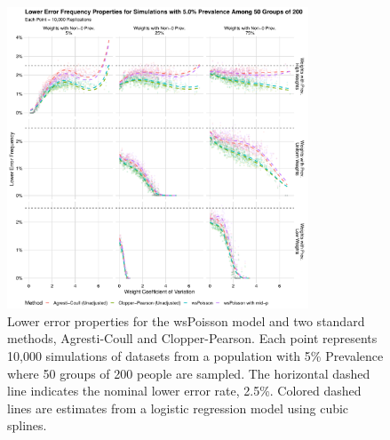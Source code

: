 \documentclass[AMA,STIX1COL]{WileyNJD-v2}
\begin{document}
\begin{figure}
\centering
\includegraphics[width=0.8\textwidth]{figures/perfect_lower_error_frequency_50_groups_0_05_prev.pdf}
\caption{Lower error properties for the wsPoisson model and two standard methods, Agresti-Coull and Clopper-Pearson.
Each point represents 10,000 simulations of datasets from a population with 5\% Prevalence where 50 groups of 200 people are sampled.
The horizontal dashed line indicates the nominal lower error rate, 2.5\%.
Colored dashed lines are estimates from a logistic regression model using cubic splines.}
\label{fig:perfect_lower_error_frequency_50_groups_0_05_prev}
\end{figure}
\end{document}
